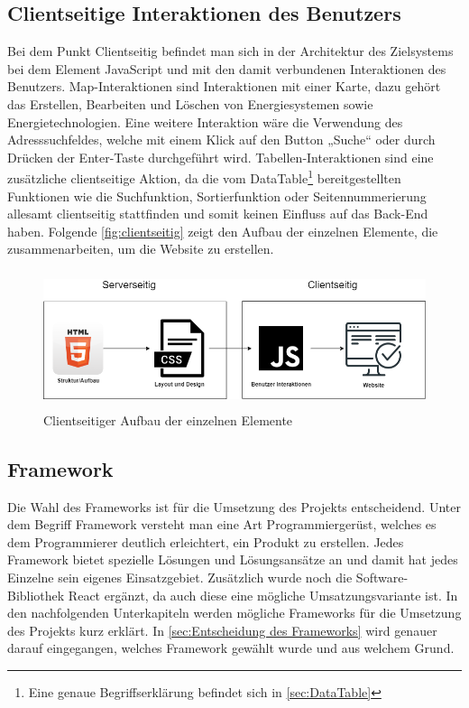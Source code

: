\subsection{Clientseitige Interaktionen des Benutzers}
Bei dem Punkt Clientseitig befindet man sich in der Architektur des Zielsystems bei dem Element JavaScript und mit den damit verbundenen Interaktionen des Benutzers. Map-Interaktionen sind Interaktionen mit einer Karte, dazu gehört das Erstellen, Bearbeiten und Löschen von Energiesystemen sowie Energietechnologien. Eine weitere Interaktion wäre die Verwendung des Adresssuchfeldes, welche mit einem Klick auf den Button „Suche“ oder durch Drücken der Enter-Taste durchgeführt wird. Tabellen-Interaktionen sind eine zusätzliche clientseitige Aktion, da die vom DataTable\footnote{Eine genaue Begriffserklärung befindet sich in \ref{sec:DataTable}} bereitgestellten Funktionen wie die Suchfunktion, Sortierfunktion oder Seitennummerierung allesamt clientseitig stattfinden und somit keinen Einfluss auf das Back-End haben.
Folgende \autoref{fig:clientseitig}
 zeigt den Aufbau der einzelnen Elemente, die zusammenarbeiten, um die Website zu erstellen.


\begin{figure}[h]
	\centering
	\includegraphics[height=4cm,width=12cm]{images/clientseitig}
	\caption{Clientseitiger Aufbau der einzelnen Elemente}
	\label{fig:clientseitig}
\end{figure}
\newpage
\subsection{Framework}
Die Wahl des Frameworks ist für die Umsetzung des Projekts entscheidend. Unter dem Begriff Framework versteht man eine Art Programmiergerüst, welches es dem Programmierer deutlich erleichtert, ein Produkt zu erstellen. Jedes Framework bietet spezielle Lösungen und Lösungsansätze an und damit hat jedes Einzelne sein eigenes Einsatzgebiet. Zusätzlich wurde noch die Software-Bibliothek React ergänzt, da auch diese eine mögliche Umsatzungsvariante ist. In den nachfolgenden Unterkapiteln werden mögliche Frameworks für die Umsetzung des Projekts kurz erklärt. In \ref{sec:Entscheidung des Frameworks} wird genauer darauf eingegangen, welches Framework gewählt wurde und aus welchem Grund.

